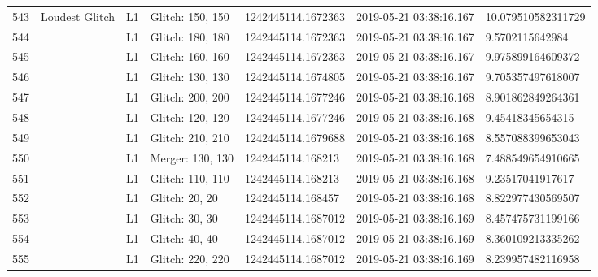 \begin{longtable}{lllllll}
543  &                                     Loudest Glitch &       L1 &  Glitch: 150, 150 &  1242445114.1672363 &  2019-05-21 03:38:16.167 &  10.079510582311729 \\
544  &                                                    &       L1 &  Glitch: 180, 180 &  1242445114.1672363 &  2019-05-21 03:38:16.167 &     9.5702115642984 \\
545  &                                                    &       L1 &  Glitch: 160, 160 &  1242445114.1672363 &  2019-05-21 03:38:16.167 &   9.975899164609372 \\
546  &                                                    &       L1 &  Glitch: 130, 130 &  1242445114.1674805 &  2019-05-21 03:38:16.167 &   9.705357497618007 \\
547  &                                                    &       L1 &  Glitch: 200, 200 &  1242445114.1677246 &  2019-05-21 03:38:16.168 &   8.901862849264361 \\
548  &                                                    &       L1 &  Glitch: 120, 120 &  1242445114.1677246 &  2019-05-21 03:38:16.168 &    9.45418345654315 \\
549  &                                                    &       L1 &  Glitch: 210, 210 &  1242445114.1679688 &  2019-05-21 03:38:16.168 &   8.557088399653043 \\
550  &                                                    &       L1 &  Merger: 130, 130 &   1242445114.168213 &  2019-05-21 03:38:16.168 &   7.488549654910665 \\
551  &                                                    &       L1 &  Glitch: 110, 110 &   1242445114.168213 &  2019-05-21 03:38:16.168 &    9.23517041917617 \\
552  &                                                    &       L1 &    Glitch: 20, 20 &   1242445114.168457 &  2019-05-21 03:38:16.168 &   8.822977430569507 \\
553  &                                                    &       L1 &    Glitch: 30, 30 &  1242445114.1687012 &  2019-05-21 03:38:16.169 &   8.457475731199166 \\
554  &                                                    &       L1 &    Glitch: 40, 40 &  1242445114.1687012 &  2019-05-21 03:38:16.169 &   8.360109213335262 \\
555  &                                                    &       L1 &  Glitch: 220, 220 &  1242445114.1687012 &  2019-05-21 03:38:16.169 &   8.239957482116958 \\

\end{longtable}
